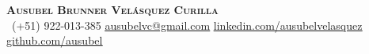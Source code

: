 \begin{center}
    \textbf{\Huge \scshape Ausubel Brunner Velásquez Curilla} \\ \vspace{1pt}
     \ \small (+51) 922-013-385 \quad
    \href{mailto:ausubelvc@gmail.com}{ \underline{ausubelvc@gmail.com}} \quad
    \href{https://www.linkedin.com/in/ausubelvelasquez/}{ \underline{linkedin.com/ausubelvelasquez}} \quad
    \href{https://github.com/ausubel/}{ \underline{github.com/ausubel}}
\end{center}